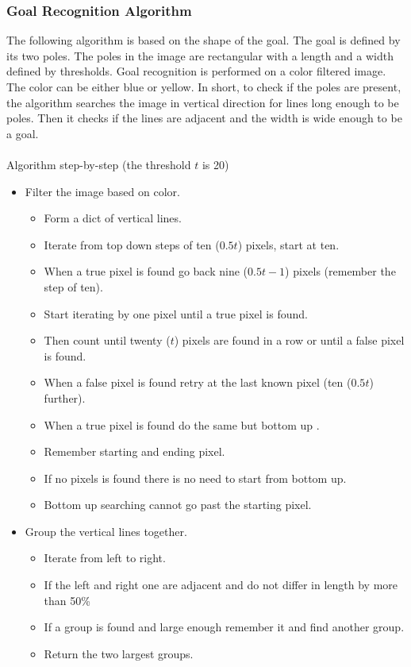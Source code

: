 \documentclass[11pt,a4paper,oneside]{article}
\begin{document}
\subsubsection{Goal Recognition Algorithm}
\label{sec:goalrecognition}
The following algorithm is based on the shape of the goal. The goal is defined by its two poles. The poles in the image are rectangular with a length and a width defined by thresholds. Goal recognition is performed on a color filtered image. The color can be either blue or yellow. In short, to check if the poles are present, the algorithm searches the image in vertical direction for lines long enough to be poles. Then it checks if the lines are adjacent and the width is wide enough to be a goal.\\\\ 
Algorithm step-by-step (the threshold $t$ is 20)
\begin{itemize}
\item Filter the image based on color.
	\begin{itemize}
	\item Form a dict of vertical lines.
	\item Iterate from top down steps of ten ($0.5t$) pixels, start at ten.
	\item When a true pixel is found go back nine ($0.5t-1$) pixels (remember the step of ten).
	\item Start iterating by one pixel until a true pixel is found.
	\item Then count until twenty ($t$) pixels are found in a row or until a false pixel is found.
	\item When a false pixel is found retry at the last known pixel (ten ($0.5t$) further).
	\item When a true pixel is found do the same but bottom up .
	\item Remember starting and ending pixel.
	\item If no pixels is found there is no need to start from bottom up.
	\item Bottom up searching cannot go past the starting pixel.
	\end{itemize}
\item Group the vertical lines together.
	\begin{itemize}
	\item Iterate from left to right.
	\item If the left and right one are adjacent and do not differ in length by more than 50\%
	\item If a group is found and large enough remember it and find another group.
	\item Return the two largest groups.
	\end{itemize}
\end{itemize}
\end{document}
